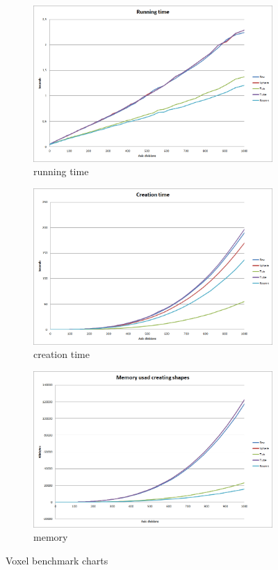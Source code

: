 \documentclass[11pt,twoside,a4paper]{report}
\begin{document}
\begin{figure}[h]
\begin{subfigure}[h]{0.49\textwidth}
	\includegraphics[width=\textwidth]{images/chart_voxel_running_time}
    \caption{running time} \label{fig:voxel running time} \end{subfigure}
    \begin{subfigure}[h]{0.49\textwidth}
	\includegraphics[width=\textwidth]{images/chart_voxel_creation_time}
    \caption{creation time} \label{fig:voxel creation time} \end{subfigure}
	\begin{subfigure}[h]{0.49\textwidth}
	\includegraphics[width=\textwidth]{images/chart_voxel_creation_memory}
	\caption{memory} \label{fig:voxel memory} \end{subfigure}
    \caption{Voxel benchmark charts}\label{fig:voxel benchmark charts}
\end{figure}
\end{document}
